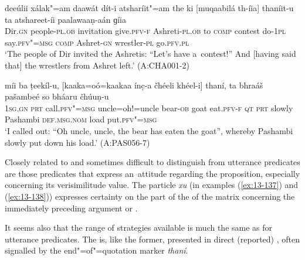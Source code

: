 \begin{exe}
\ex
\label{ex:13-135}
\gll deeúlii xálak"=am daawát dít-i  atsharíit"=am the ki [muqaabilá
  th-íia]  thaníit-u ta atshareet-íi paalawaaṇ-aán ɡíia \\
Dir.\textsc{gn} people-\textsc{pl.ob} invitation give.\textsc{pfv-f}  Ashreti-\textsc{pl.ob} to \textsc{comp} contest do-\textsc{1pl}  say.\textsc{pfv"=msg} \textsc{comp} Ashret-\textsc{gn} wrestler-\textsc{pl} go.\textsc{pfv.pl} \\
\glt `The people of Dir invited the Ashretis: ``Let's have a~contest!'' And [having said that] the wrestlers from Ashret left.' (A:CHA001-2)

\ex
\label{ex:13-136}
\gll míi ba ṭeekíl-u, [kaaka=oó=kaakaa ínc̣-a čhéeli  khéel-i]
thaní, ta bhraáš pašambeé so  bháaru čhúuṇ-u \\
\textsc{1sg.gn} \textsc{prt} call.\textsc{pfv"=msg} uncle=oh!=uncle bear-\textsc{ob} goat  eat.\textsc{pfv-f} \textsc{qt } \textsc{prt} slowly Pashambi \textsc{def.msg.nom} load put.\textsc{pfv"=msg}  \\
\glt `I called out: ``Oh uncle, uncle, the bear has eaten the goat'', whereby Pashambi slowly put down his load.' (A:PAS056-7) 
\end{exe}

 Closely related to and sometimes difficult to distinguish from utterance predicates are those predicates that express an~attitude regarding the  proposition, especially concerning its verisimilitude value. The particle \textit{xu} (in examples (\ref{ex:13-137}) and (\ref{ex:13-138})) expresses certainty on the part of the  of the matrix  concerning the immediately preceding argument or .


It seems also that the range of strategies available is much the same as for utterance predicates. The  is, like the former, presented in direct (reported) , often signalled by the end"=of"=quotation marker \textit{thaní}. 

